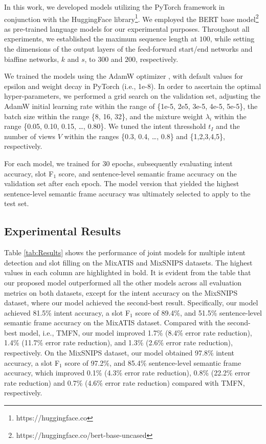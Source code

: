 \documentclass{ecai}
\begin{document}
In this work, we developed models utilizing the PyTorch framework in conjunction with the HuggingFace library\footnote{https://huggingface.co}. We employed the BERT base model\footnote{https://huggingface.co/bert-base-uncased} as pre-trained language models for our experimental purposes. Throughout all experiments, we established the maximum sequence length at $100$, while setting the dimensions of the output layers of the feed-forward start/end networks and biaffine networks, $k$ and $s$, to $300$ and $200$, respectively.

We trained the models using the AdamW optimizer \cite{Loshchilov:2019}, with default values for epsilon and weight decay in PyTorch (i.e., 1e-8). In order to ascertain the optimal hyper-parameters, we performed a grid search on the validation set, adjusting the AdamW initial learning rate within the range of \{1e-5, 2e5, 3e-5, 4e-5, 5e-5\}, the batch size within the range \{8, 16, 32\}, and the mixture weight $\lambda_i$ within the range \{0.05, 0.10, 0.15, \ldots, 0.80\}.  We tuned the intent thresshold $t_I$ and the number of views $V$ within the ranges \{0.3, 0.4, \ldots , 0.8\} and \{1,2,3,4,5\}, respectively.

For each model, we trained for $30$ epochs, subsequently evaluating intent accuracy, slot F$_1$ score, and sentence-level semantic frame accuracy on the validation set after each epoch. The model version that yielded the highest sentence-level semantic frame accuracy was ultimately selected to apply to the test set. 

\subsection{Experimental Results}
Table \ref{tab:Results} shows the performance of joint models for multiple intent detection and slot filling on the MixATIS and MixSNIPS datasets. The highest values in each column are highlighted in bold. It is evident from the table that our proposed model outperformed all the other models across all evaluation metrics on both datasets, except for the intent accuracy on the MixSNIPS dataset, where our model achieved the second-best result. Specifically, our model achieved 81.5\% intent accuracy, a slot F$_1$ score of 89.4\%, and 51.5\% sentence-level semantic frame accuracy on the MixATIS dataset. Compared with the second-best model, i.e., TMFN, our model improved 1.7\% (8.4\% error rate reduction), 1.4\% (11.7\% error rate reduction), and 1.3\% (2.6\% error rate reduction), respectively. On the MixSNIPS dataset, our model obtained 97.8\% intent accuracy, a slot F$_1$ score of 97.2\%, and 85.4\% sentence-level semantic frame accuracy, which improved 0.1\% (4.3\% error rate reduction), 0.8\% (22.2\% error rate reduction) and 0.7\% (4.6\% error rate reduction) compared with TMFN, respectively.
\end{document}
